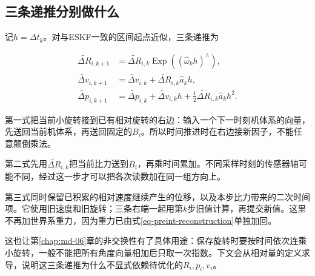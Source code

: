 \subsection{三条递推分别做什么}

记$h=\Delta t_k$。对与ESKF一致的区间起点近似，三条递推为

\begin{equation}\label{eq-intuition-preint-step}
\begin{aligned}
 \widetilde{\Delta R}_{i,k+1}
 &=\widetilde{\Delta R}_{i,k}\mathop{\mathrm{Exp}}((\hat\omega_kh)^\wedge),\\
 \widetilde{\Delta v}_{i,k+1}
 &=\widetilde{\Delta v}_{i,k}+\widetilde{\Delta R}_{i,k}\hat a_kh,\\
 \widetilde{\Delta p}_{i,k+1}
 &=\widetilde{\Delta p}_{i,k}+\widetilde{\Delta v}_{i,k}h
   +\tfrac12\widetilde{\Delta R}_{i,k}\hat a_kh^2.
\end{aligned}
\end{equation}

第一式把当前小旋转接到已有相对旋转的右边：输入一个下一时刻机体系的向量，先送回当前机体系，再送回固定的$B_i$。所以时间推进时在右边接新因子，不能任意颠倒乘法。

第二式先用$\widetilde{\Delta R}_{i,k}$把当前比力送到$B_i$，再乘时间累加。不同采样时刻的传感器轴可能不同，经过这一步才可以把各次读数加在同一组方向上。

第三式同时保留已积累的相对速度继续产生的位移，以及本步比力带来的二次时间项。它使用旧速度和旧旋转；三条右端一起用第$k$步旧值计算，再提交新值。这里不再加世界系重力，因为重力已由式\eqref{eq-preint-reconstruction}单独加回。

这也让第\ref{chap:md-06}章的非交换性有了具体用途：保存旋转时要按时间依次连乘小旋转，一般不能把所有角度向量相加后只取一次指数。下文会从相对量的定义求导，说明这三条递推为什么不显式依赖待优化的$R_i,p_i,v_i$。

